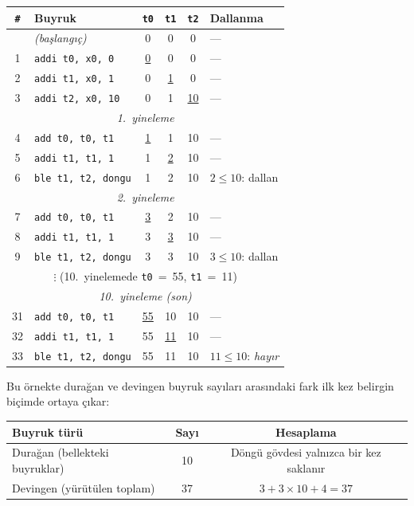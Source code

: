\begin{ornek}[4.5]
\begin{center}
\small
\begin{tabular}{clcccl}
\toprule
\texttt{\#} & Buyruk & \texttt{t0} & \texttt{t1} & \texttt{t2} & Dallanma \\
\midrule
  & \emph{(başlangıç)} & 0 & 0 & 0 & --- \\
1 & \texttt{addi t0, x0, 0} & \underline{0} & 0 & 0 & --- \\
2 & \texttt{addi t1, x0, 1} & 0 & \underline{1} & 0 & --- \\
3 & \texttt{addi t2, x0, 10} & 0 & 1 & \underline{10} & --- \\
\midrule
\multicolumn{6}{c}{\emph{1.~yineleme}} \\
4 & \texttt{add t0, t0, t1} & \underline{1} & 1 & 10 & --- \\
5 & \texttt{addi t1, t1, 1} & 1 & \underline{2} & 10 & --- \\
6 & \texttt{ble t1, t2, dongu} & 1 & 2 & 10 & $2 \leq 10$: dallan \\
\midrule
\multicolumn{6}{c}{\emph{2.~yineleme}} \\
7 & \texttt{add t0, t0, t1} & \underline{3} & 2 & 10 & --- \\
8 & \texttt{addi t1, t1, 1} & 3 & \underline{3} & 10 & --- \\
9 & \texttt{ble t1, t2, dongu} & 3 & 3 & 10 & $3 \leq 10$: dallan \\
\midrule
\multicolumn{6}{c}{$\vdots$ \quad (10.~yinelemede \texttt{t0}~=~55, \texttt{t1}~=~11)} \\
\midrule
\multicolumn{6}{c}{\emph{10.~yineleme (son)}} \\
31 & \texttt{add t0, t0, t1} & \underline{55} & 10 & 10 & --- \\
32 & \texttt{addi t1, t1, 1} & 55 & \underline{11} & 10 & --- \\
33 & \texttt{ble t1, t2, dongu} & 55 & 11 & 10 & $11 \leq 10$: \emph{hayır} \\
\bottomrule
\end{tabular}
\end{center}

Bu örnekte durağan ve devingen buyruk sayıları arasındaki fark ilk kez belirgin biçimde ortaya çıkar:

\begin{center}
\small
\begin{tabular}{lcc}
\toprule
Buyruk türü & Sayı & Hesaplama \\
\midrule
Durağan (bellekteki buyruklar) & 10 & Döngü gövdesi yalnızca bir kez saklanır \\
Devingen (yürütülen toplam) & 37 & $3 + 3 \times 10 + 4 = 37$ \\
\bottomrule
\end{tabular}
\end{center}


\end{ornek}
